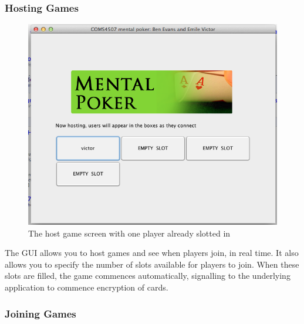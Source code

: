 \documentclass[11pt, oneside]{article}   	%
\begin{document}
\pagebreak
\subsubsection{Hosting Games}

\begin{figure}[h!]

\caption{The host game screen with one player already slotted in}
	\label{hostGame}
\centering
\includegraphics[bb=0 0 671 541,scale=0.55]{images/hostgame.png}
\end{figure}

The GUI allows you to host games and see when players join, in real time. It also allows you to specify the number of slots available for players to join. When these slots are filled, the game commences automatically, signalling to the underlying application to commence encryption of cards.

\pagebreak
\subsubsection{Joining Games}
\end{document}
